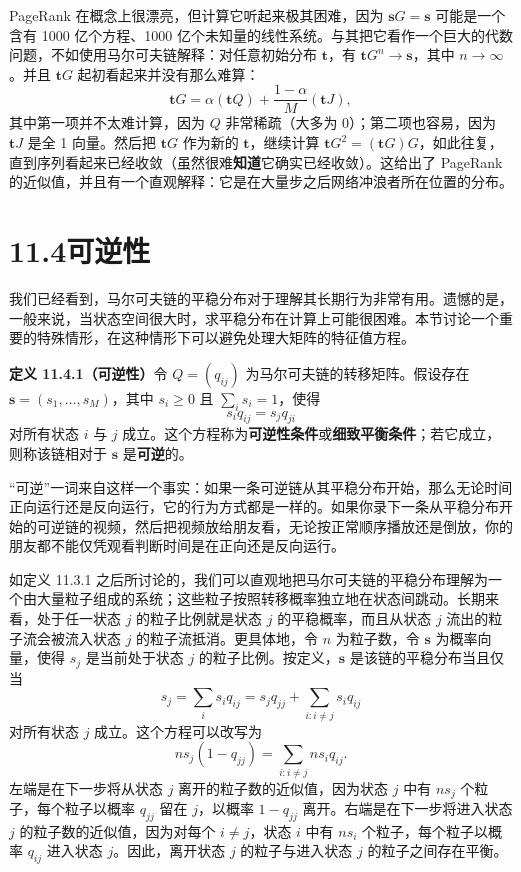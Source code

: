 \documentclass[UTF8,12pt,a4paper,fontset=fandol]{ctexart}
\begin{document}
PageRank 在概念上很漂亮，但计算它听起来极其困难，因为 $\mathbf sG=\mathbf s$ 可能是一个含有 1000 亿个方程、1000 亿个未知量的线性系统。与其把它看作一个巨大的代数问题，不如使用马尔可夫链解释：对任意初始分布 $\mathbf t$，有 $\mathbf tG^n\to\mathbf s$，其中 $n\to\infty$。并且 $\mathbf tG$ 起初看起来并没有那么难算：
\[
  \mathbf tG
  =
  \alpha(\mathbf tQ)+\frac{1-\alpha}{M}(\mathbf tJ),
\]
其中第一项并不太难计算，因为 $Q$ 非常稀疏（大多为 0）；第二项也容易，因为 $\mathbf tJ$ 是全 1 向量。然后把 $\mathbf tG$ 作为新的 $\mathbf t$，继续计算 $\mathbf tG^2=(\mathbf tG)G$，如此往复，直到序列看起来已经收敛（虽然很难\textbf{知道}它确实已经收敛）。这给出了 PageRank 的近似值，并且有一个直观解释：它是在大量步之后网络冲浪者所在位置的分布。

\section*{11.4\quad 可逆性}

我们已经看到，马尔可夫链的平稳分布对于理解其长期行为非常有用。遗憾的是，一般来说，当状态空间很大时，求平稳分布在计算上可能很困难。本节讨论一个重要的特殊情形，在这种情形下可以避免处理大矩阵的特征值方程。

\noindent\textbf{定义 11.4.1（可逆性）}\quad 令 $Q=(q_{ij})$ 为马尔可夫链的转移矩阵。假设存在 $\mathbf s=(s_1,\ldots,s_M)$，其中 $s_i\ge0$ 且 $\sum_i s_i=1$，使得
\[
  s_iq_{ij}=s_jq_{ji}
\]
对所有状态 $i$ 与 $j$ 成立。这个方程称为\textbf{可逆性条件}或\textbf{细致平衡条件}；若它成立，则称该链相对于 $\mathbf s$ 是\textbf{可逆}的。

“可逆”一词来自这样一个事实：如果一条可逆链从其平稳分布开始，那么无论时间正向运行还是反向运行，它的行为方式都是一样的。如果你录下一条从平稳分布开始的可逆链的视频，然后把视频放给朋友看，无论按正常顺序播放还是倒放，你的朋友都不能仅凭观看判断时间是在正向还是反向运行。

如定义 11.3.1 之后所讨论的，我们可以直观地把马尔可夫链的平稳分布理解为一个由大量粒子组成的系统；这些粒子按照转移概率独立地在状态间跳动。长期来看，处于任一状态 $j$ 的粒子比例就是状态 $j$ 的平稳概率，而且从状态 $j$ 流出的粒子流会被流入状态 $j$ 的粒子流抵消。更具体地，令 $n$ 为粒子数，令 $\mathbf s$ 为概率向量，使得 $s_j$ 是当前处于状态 $j$ 的粒子比例。按定义，$\mathbf s$ 是该链的平稳分布当且仅当
\[
  s_j=\sum_i s_iq_{ij}=s_jq_{jj}+\sum_{i:i\ne j}s_iq_{ij}
\]
对所有状态 $j$ 成立。这个方程可以改写为
\[
  ns_j(1-q_{jj})=\sum_{i:i\ne j}ns_iq_{ij}.
\]
左端是在下一步将从状态 $j$ 离开的粒子数的近似值，因为状态 $j$ 中有 $ns_j$ 个粒子，每个粒子以概率 $q_{jj}$ 留在 $j$，以概率 $1-q_{jj}$ 离开。右端是在下一步将进入状态 $j$ 的粒子数的近似值，因为对每个 $i\ne j$，状态 $i$ 中有 $ns_i$ 个粒子，每个粒子以概率 $q_{ij}$ 进入状态 $j$。因此，离开状态 $j$ 的粒子与进入状态 $j$ 的粒子之间存在平衡。
\end{document}

